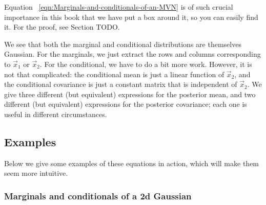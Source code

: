 Equation ~\eqref{eqn:Marginals-and-conditionals-of-an-MVN} is of such crucial importance in this book that we have put a box around it, so you can easily find it. For the proof, see Section TODO.

We see that both the marginal and conditional distributions are themselves Gaussian. For the marginals, we just extract the rows and columns corresponding to $\vec{x}_1$ or $\vec{x}_2$. For the conditional, we have to do a bit more work. However, it is not that complicated: the conditional mean is just a linear function of $\vec{x}_2$, and the conditional covariance is just a constant matrix that is independent of $\vec{x}_2$. We give three different (but equivalent) expressions for the posterior mean, and two different (but equivalent) expressions for the posterior covariance; each one is useful in different circumstances.


\subsection{Examples}
Below we give some examples of these equations in action, which will make them seem more intuitive.


\subsubsection{Marginals and conditionals of a 2d Gaussian}



